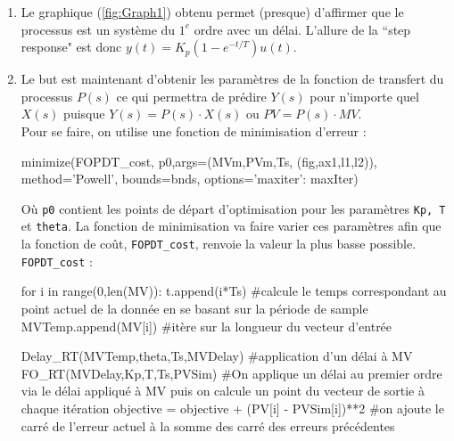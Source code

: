 \documentclass{article}
\begin{document}
\begin{enumerate}
    \item Le graphique (\ref{fig:Graph1}) obtenu permet (presque) d'affirmer que le processus est un système du $1^{e}$ ordre avec un délai. L'allure de la ``step response" est donc $y(t) = K_p (1-e^{-t/T})u(t)$.

    \item Le but est maintenant d'obtenir les paramètres de la fonction de transfert du processus $P(s)$ ce qui permettra de prédire $Y(s)$ pour n'importe quel $X(s)$ puisque $Y(s) = P(s) \cdot X(s)$ ou $PV = P(s)\cdot MV$. 
    \\Pour se faire, on utilise une fonction de minimisation d'erreur : 
    \begin{python*}
        minimize(FOPDT_cost,
            p0,args=(MVm,PVm,Ts,
            (fig,ax1,l1,l2)), 
            method='Powell',
            bounds=bnds,
            options={'maxiter': maxIter})
    \end{python*}

    Où \texttt{p0} contient les points de départ d'optimisation pour les paramètres \texttt{Kp, T} et \texttt{theta}. La fonction de minimisation va faire varier ces paramètres afin que la fonction de coût, \texttt{FOPDT\_cost}, renvoie la valeur la plus basse possible. 
    \\ \texttt{FOPDT\_cost} : 

    \begin{python*}
        for i in range(0,len(MV)):
            t.append(i*Ts) #calcule le temps correspondant au point actuel                  de la donnée en se basant sur la période de sample
            MVTemp.append(MV[i]) #itère sur la longueur du vecteur d'entrée

            Delay_RT(MVTemp,theta,Ts,MVDelay) #application d'un délai à MV  
            FO_RT(MVDelay,Kp,T,Ts,PVSim) #On applique un délai au premier ordre via le délai appliqué à MV puis on calcule un point du vecteur de sortie à chaque itération 
            objective = objective + (PV[i] - PVSim[i])**2 #on ajoute le carré de l'erreur actuel à la somme des carré des erreurs précédentes   
    \end{python*}
\end{enumerate}

    
\end{document}
